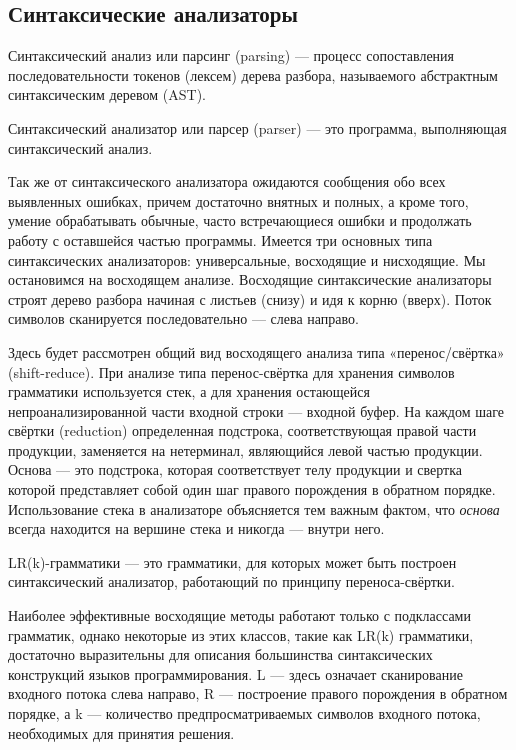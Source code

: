 \label{sec:relatedworks}

\subsection{Синтаксические анализаторы}
Синтаксический анализ или парсинг (parsing) --- процесс сопоставления последовательности токенов (лексем) дерева разбора, называемого абстрактным синтаксическим деревом (AST).

Синтаксический анализатор или парсер (parser) --- это программа, выполняющая синтаксический анализ.

Так же от синтаксического анализатора ожидаются сообщения обо всех выявленных ошибках, причем достаточно внятных и полных, а кроме того, умение обрабатывать обычные, часто встречающиеся ошибки и продолжать работу с оставшейся частью программы.
Имеется три основных типа синтаксических анализаторов: универсальные, восходящие и нисходящие\cite{DB}. Мы остановимся на восходящем анализе. Восходящие синтаксические анализаторы строят дерево разбора начиная с листьев (снизу) и идя к корню (вверх). Поток символов сканируется последовательно --- слева направо.

Здесь будет рассмотрен общий вид восходящего анализа типа «перенос/свёртка» (shift-reduce). При анализе типа перенос-свёртка для хранения символов грамматики используется стек, а для хранения остающейся непроанализированной части входной строки --- входной буфер. На каждом шаге свёртки (reduction) определенная подстрока, соответствующая правой части продукции, заменяется на нетерминал, являющийся левой частью продукции. Основа --- это подстрока, которая соответствует телу продукции и свертка которой представляет собой один шаг правого порождения в обратном порядке. Использование стека в анализаторе объясняется тем важным фактом, что {\it основа} всегда находится на вершине стека и никогда --- внутри него.

LR(k)-грамматики --- это грамматики, для которых может быть построен синтаксический анализатор, работающий по принципу переноса-свёртки.

Наиболее эффективные восходящие методы работают только с подклассами грамматик, однако некоторые из этих классов, такие как LR(k) грамматики, достаточно выразительны для описания большинства синтаксических конструкций языков программирования.
L --- здесь означает сканирование входного потока слева направо, R --- построение правого порождения в обратном порядке, а k --- количество предпросматриваемых символов входного потока, необходимых для принятия решения. 

